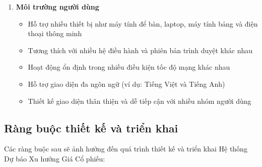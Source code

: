\documentclass[12pt, a4paper]{article}
\begin{document}
\begin{enumerate}
    \item \textbf{Môi trường người dùng}
          \begin{itemize}
              \item Hỗ trợ nhiều thiết bị như máy tính để bàn, laptop, máy tính bảng và điện thoại thông minh
              \item Tương thích với nhiều hệ điều hành và phiên bản trình duyệt khác nhau
              \item Hoạt động ổn định trong nhiều điều kiện tốc độ mạng khác nhau
              \item Hỗ trợ giao diện đa ngôn ngữ (ví dụ: Tiếng Việt và Tiếng Anh)
              \item Thiết kế giao diện thân thiện và dễ tiếp cận với nhiều nhóm người dùng
          \end{itemize}

\end{enumerate}

\subsection{Ràng buộc thiết kế và triển khai}

Các ràng buộc sau sẽ ảnh hưởng đến quá trình thiết kế và triển khai Hệ thống Dự báo Xu hướng Giá Cổ phiếu:
\end{document}
